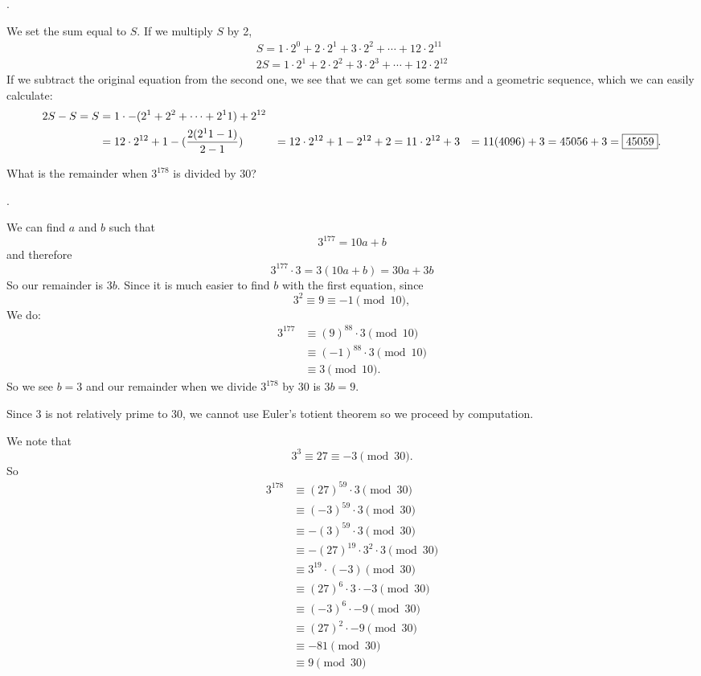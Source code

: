 \documentclass[11pt]{article}
\DeclareRobustCommand{\frac}[3][0pt]{%
  {\begingroup\hspace{#1}#2\hspace{#1}\endgroup\over\hspace{#1}#3\hspace{#1}}}
\begin{document}
\begin{answer}
.
\end{answer}
\begin{solution}
We set the sum equal to $S$. If we multiply $S$ by 2,
\begin{align*}
S = 1\cdot2^{0} + 2\cdot2^1 + 3\cdot2^2 +\cdots+12\cdot2^{11} \\
2S = 1\cdot2^{1} + 2\cdot2^2 + 3\cdot2^3 +\cdots+12\cdot2^{12}
\end{align*}
If we subtract the original equation from the second one, we see that we can get some terms and a geometric sequence, which we can easily calculate:
\begin{align*}
2S-S=S &=1 \cdot - (2^1+2^2+\cdots+2^11)+2^{12} \\
&= 12\cdot 2^{12}+1 - (\frac{2(2^11-1)}{2-1})
&= 12\cdot 2^{12}+1-2^{12}+2
&= 11 \cdot 2^{12} +3
&= 11(4096) +3 = 45056+3 = \boxed{45059}.
\end{align*}
\end{solution}

\begin{problem}What is the remainder when $3^{178}$ is divided by 30?
\end{problem}
\begin{answer}
.
\end{answer}
\begin{solutionone}
We can find $a$ and $b$ such that
$$3^{177} = 10a+b$$
and therefore
$$3^{177} \cdot 3 = 3(10a+b) = 30a+3b$$
So our remainder is $3b$. Since it is much easier to find $b$ with the first equation, since
$$3^2 \equiv 9 \equiv -1 \pmod{10},$$
We do:
\begin{align*}
3^{177} &\equiv (9)^{88} \cdot 3  \pmod{10} \\
&\equiv (-1)^{88} \cdot 3 \pmod{10} \\
&\equiv 3 \pmod{10}.
\end{align*}
So we see $b=3$ and our remainder when we divide $3^{178}$ by 30 is $3b = \boxed{9}$.
\end{solutionone}
\begin{solutiontwo}
Since 3 is not relatively prime to 30, we cannot use Euler's totient theorem so we proceed by computation. \par
We note that
$$3^3 \equiv 27 \equiv -3 \pmod{30}.$$
So
\begin{align*}
3^{178} &\equiv (27)^{59} \cdot 3 \pmod{30} \\
&\equiv (-3)^{59} \cdot 3 \pmod{30}\\
&\equiv -(3)^{59} \cdot 3 \pmod{30}\\
&\equiv -(27)^{19} \cdot 3^2 \cdot 3 \pmod{30}\\
&\equiv 3^{19} \cdot (-3) \pmod{30}\\
&\equiv (27)^6 \cdot 3 \cdot -3  \pmod{30}\\
&\equiv (-3)^6 \cdot -9 \pmod{30}\\
&\equiv (27)^2 \cdot -9 \pmod{30}\\
&\equiv -81 \pmod{30}\\
&\equiv \boxed{9} \pmod{30}\\
\end{align*}
\end{solutiontwo}
\end{document}
